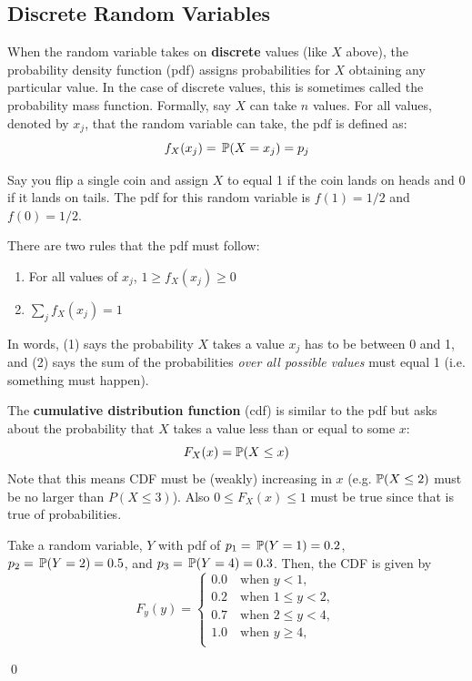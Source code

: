 \documentclass[12pt]{article}
\begin{document}
\subsection*{Discrete Random Variables}

When the random variable takes on \textbf{discrete} values (like $X$ above), the probability density function (pdf) assigns probabilities for $X$ obtaining any particular value. In the case of discrete values, this is sometimes called the probability mass function. Formally, say $X$ can take $n$ values. For all values, denoted by $x_j$, that the random variable can take, the pdf is defined as:
$$
  f_{X}(x_j) = \P{X = x_j} = p_j
$$

\begin{example}
  Say you flip a single coin and assign $X$ to equal 1 if the coin lands on heads and 0 if it lands on tails. The pdf for this random variable is $f(1) = 1/2$ and $f(0) = 1/2$.
\end{example}

There are two rules that the pdf must follow:
\begin{enumerate}
  \item For all values of $x_j$, $1 \geq f_{X}(x_j) \geq 0$ 
  \item $\sum_{j} f_{X}(x_j) = 1$
\end{enumerate}
In words, (1) says the probability $X$ takes a value $x_j$ has to be between 0 and 1, and (2) says the sum of the probabilities \emph{over all possible values} must equal 1 (i.e. something must happen).


The \textbf{cumulative distribution function} (cdf) is similar to the pdf but asks about the probability that $X$ takes a value less than or equal to some $x$:
$$
  F_{X}(x) = \P(X \leq x)
$$
Note that this means CDF must be (weakly) increasing in $x$ (e.g. $\P(X \leq 2)$ must be no larger than $P(X \leq 3)$). Also $0 \leq F_{X}(x) \leq 1$ must be true since that is true of probabilities.

\begin{example}
  Take a random variable, $Y$ with pdf of $p_1 = \P{Y = 1} = 0.2$, $p_2 = \P{Y = 2} = 0.5$, and $p_3 = \P{Y = 4} = 0.3$. Then, the CDF is given by 
  $$
    F_{y}(y) = \begin{cases}
      0.0   \quad \text{when } y < 1, \\
      0.2 \quad \text{when } 1 \leq y < 2, \\
      0.7 \quad \text{when } 2 \leq y < 4, \\
      1.0   \quad \text{when } y \geq 4, \\
    \end{cases}
  $$

  \qed
\end{example}
\end{document}
